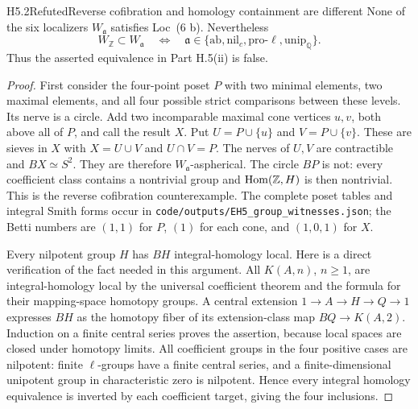 \begin{claim}{H5.2}{Refuted}{Reverse cofibration and homology containment are different}
None of the six localizers $W_{\mathfrak a}$ satisfies Loc~(6 b).
Nevertheless
\[
 W_{\mathbb Z}\subset W_{\mathfrak a}
 \quad\Longleftrightarrow\quad
 \mathfrak a\in
 \{\mathrm{ab},\mathrm{nil}_c,\mathrm{pro}\mbox{-}\ell,
                         \mathrm{unip}_{\mathbb Q}\}.
                                                        \tag{H5.2.1}
\]
Thus the asserted equivalence in Part H.5(ii) is false.
\end{claim}
\begin{proof}
First consider the four-point poset $P$ with two minimal elements,
two maximal elements, and all four possible strict comparisons
between these levels. Its nerve is a circle. Add two incomparable
maximal cone vertices $u,v$, both above all of $P$, and call the
result $X$. Put $U=P\cup\{u\}$ and $V=P\cup\{v\}$. These are
sieves in $X$ with $X=U\cup V$ and $U\cap V=P$.
The nerves of $U,V$ are contractible and $BX\simeq S^2$.
They are therefore $W_{\mathfrak a}$-aspherical. The circle $BP$
is not: every coefficient class contains a nontrivial group and
$\operatorname{Hom}(\mathbb Z,H)$ is then nontrivial. This is the reverse
cofibration counterexample. The complete poset tables and integral
Smith forms occur in
\texttt{code/outputs/EH5\_group\_witnesses.json}; the Betti numbers
are $(1,1)$ for $P$, $(1)$ for each cone, and $(1,0,1)$ for $X$.

Every nilpotent group $H$ has $BH$ integral-homology local.
Here is a direct verification of the fact needed in this argument.
All $K(A,n)$, $n\geq1$, are integral-homology local by the universal
coefficient theorem and the formula for their mapping-space
homotopy groups. A central extension
$1\to A\to H\to Q\to1$ expresses $BH$ as the homotopy fiber
of its extension-class map $BQ\to K(A,2)$. Induction on a finite
central series proves the assertion, because local spaces are
closed under homotopy limits. All coefficient groups in the four
positive cases are nilpotent: finite $\ell$-groups have a finite
central series, and a finite-dimensional unipotent group in
characteristic zero is nilpotent. Hence every integral homology
equivalence is inverted by each coefficient target, giving the
four inclusions.


\end{proof}
